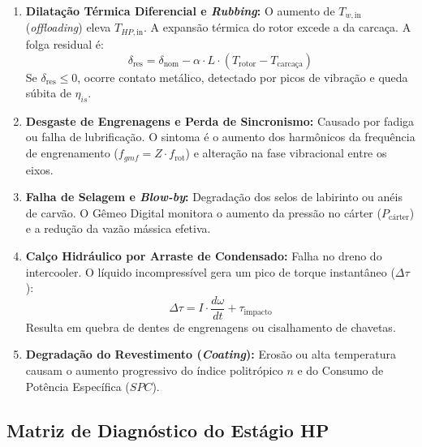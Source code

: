 \documentclass[12pt,a4paper]{article}
\numberwithin{equation}{section}
\numberwithin{table}{section}
\numberwithin{figure}{section}
\begin{document}
	\begin{enumerate}
		\item \textbf{Dilatação Térmica Diferencial e \textit{Rubbing}:}
		O aumento de $T_{w,\text{in}}$ (\textit{offloading}) eleva $T_{HP,\text{in}}$. A expansão térmica do rotor excede a da carcaça. A folga residual é:
		\begin{equation}\label{eq:s11-7}
 \delta_{\text{res}} = \delta_{\text{nom}} - \alpha \cdot L \cdot (T_{\text{rotor}} - T_{\text{carcaça}}) 
\end{equation}
		Se $\delta_{\text{res}} \le 0$, ocorre contato metálico, detectado por picos de vibração e queda súbita de $\eta_{is}$.
		
		\item \textbf{Desgaste de Engrenagens e Perda de Sincronismo:}
		Causado por fadiga ou falha de lubrificação. O sintoma é o aumento dos harmônicos da frequência de engrenamento ($f_{gmf} = Z \cdot f_{\text{rot}}$) e alteração na fase vibracional entre os eixos.
		
		\item \textbf{Falha de Selagem e \textit{Blow-by}:}
		Degradação dos selos de labirinto ou anéis de carvão. O Gêmeo Digital monitora o aumento da pressão no cárter ($P_{\text{cárter}}$) e a redução da vazão mássica efetiva.
		
		\item \textbf{Calço Hidráulico por Arraste de Condensado:}
		Falha no dreno do intercooler. O líquido incompressível gera um pico de torque instantâneo ($\Delta \tau$):
		\begin{equation}\label{eq:s11-8}
 \Delta \tau = I \cdot \frac{d\omega}{dt} + \tau_{\text{impacto}} 
\end{equation}
		Resulta em quebra de dentes de engrenagens ou cisalhamento de chavetas.
		
		\item \textbf{Degradação do Revestimento (\textit{Coating}):}
		Erosão ou alta temperatura causam o aumento progressivo do índice politrópico $n$ e do Consumo de Potência Específica ($SPC$).
	\end{enumerate}
	
	\subsection{\textbf{Matriz de Diagnóstico do Estágio HP}}
\end{document}
